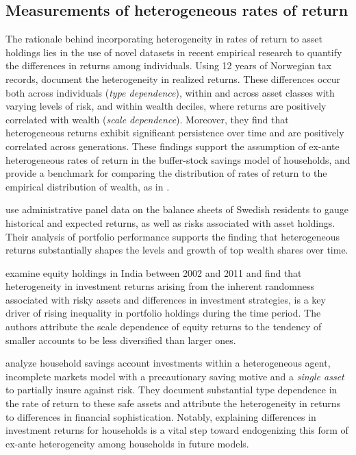 \subsection{Measurements of heterogeneous rates of return}

\par The rationale behind incorporating heterogeneity in rates of return to asset holdings lies in the use of novel datasets in recent empirical research to quantify the differences in returns among individuals. Using 12 years of Norwegian tax records, \cite{aflgdmlp20} document the heterogeneity in realized returns. These differences occur both across individuals (\textit{type dependence}), within and across asset classes with varying levels of risk, and within wealth deciles, where returns are positively correlated with wealth  (\textit{scale dependence}). Moreover, they find that heterogeneous returns exhibit significant persistence over time and are positively correlated across generations. These findings support the assumption of ex-ante heterogeneous rates of return in the buffer-stock savings model of households, and provide a benchmark for comparing the distribution of rates of return to the empirical distribution of wealth, as in \cite{cstw2017}. 

\par \cite{lblcps18} use administrative panel data on the balance sheets of Swedish residents to gauge historical and expected returns, as well as risks associated with asset holdings. Their analysis of portfolio performance supports the finding that heterogeneous returns substantially shapes the levels and growth of top wealth shares over time.

\par \cite{Campbell2019} examine equity holdings in India between 2002 and 2011 and find that heterogeneity in investment returns arising from the inherent randomness associated with risky assets and differences in investment strategies, is a key driver of rising inequality in portfolio holdings during the time period. The authors attribute the scale dependence of equity returns to the tendency of smaller accounts to be less diversified than larger ones.

\par \cite{Deuflhard2018} analyze household savings account investments within a heterogeneous agent, incomplete markets model with a precautionary saving motive and a \textit{single asset} to partially insure against risk. They document substantial type dependence in the rate of return to these safe assets and attribute the heterogeneity in returns to differences in financial sophistication. Notably, explaining differences in investment returns for households is a vital step toward endogenizing this form of ex-ante heterogeneity among households in future models.

